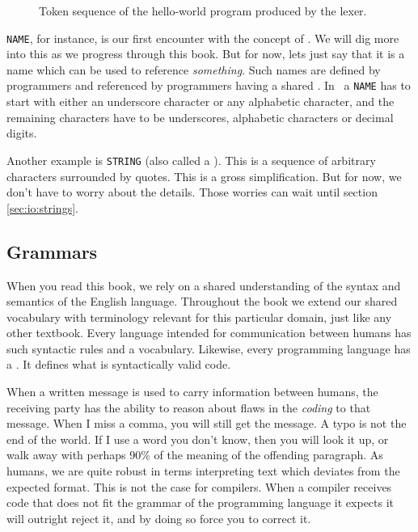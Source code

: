 \begin{figure}[tbp]
  
  \caption{Token sequence of the hello-world program produced by the lexer.}
  \label{fig:first:hello:tokens}
\end{figure}

\texttt{NAME}, for instance, is our first encounter with the concept of . We will dig more into this as we progress through this book. But for now, lets just say that it is a name which can be used to reference \textsl{something}. Such names are defined by programmers and referenced by programmers having a shared . In \csharp\ a \texttt{NAME} has to start with either an underscore character or any alphabetic character, and the remaining characters have to be underscores, alphabetic characters or decimal digits.

Another example is \texttt{STRING} (also called a ). This is a sequence of arbitrary characters surrounded by quotes. This is a gross simplification. But for now, we don't have to worry about the details. Those worries can wait until section \ref{sec:io:strings}.

\subsection{Grammars}

When you read this book, we rely on a shared understanding of the syntax and semantics of the English language. Throughout the book we extend our shared vocabulary with terminology relevant for this particular domain, just like any other textbook. Every language intended for communication between humans has such syntactic rules and a vocabulary. Likewise, every programming language has a . It defines what is syntactically valid code.

When a written  message is used to carry information between humans, the receiving party has the ability to reason about flaws in the \textsl{coding} to that message. When I miss a comma, you will still get the message. A typo is not the end of the world. If I use a word you don't know, then you will look it up, or walk away with perhaps 90\% of the meaning of the offending paragraph. As humans, we are quite robust in terms interpreting text which deviates from the expected format. This is not the case for compilers. When a compiler receives code that does not fit the grammar of the programming language it expects it will outright reject it, and by doing so force you to correct it.

